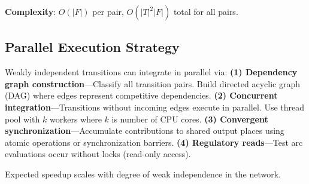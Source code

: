 \textbf{Complexity}: $O(|F|)$ per pair, $O(|T|^2 |F|)$ total for all pairs.

\subsection{Parallel Execution Strategy}

Weakly independent transitions can integrate in parallel via: \textbf{(1) Dependency graph construction}---Classify all transition pairs. Build directed acyclic graph (DAG) where edges represent competitive dependencies. \textbf{(2) Concurrent integration}---Transitions without incoming edges execute in parallel. Use thread pool with $k$ workers where $k$ is number of CPU cores. \textbf{(3) Convergent synchronization}---Accumulate contributions to shared output places using atomic operations or synchronization barriers. \textbf{(4) Regulatory reads}---Test arc evaluations occur without locks (read-only access).

Expected speedup scales with degree of weak independence in the network.

